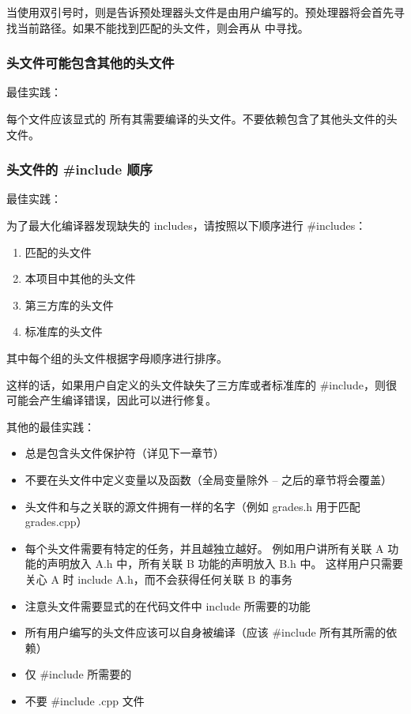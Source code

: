 \documentclass[../../LearnCpp.tex]{subfiles}
\begin{document}
当使用双引号时，则是告诉预处理器头文件是由用户编写的。预处理器将会首先寻找当前路径。如果不能找到匹配的头文件，则会再从  中寻找。

\subsubsection*{头文件可能包含其他的头文件}

最佳实践：

每个文件应该显式的  所有其需要编译的头文件。不要依赖包含了其他头文件的头文件。

\subsubsection*{头文件的 \#include 顺序}

最佳实践：

为了最大化编译器发现缺失的 includes，请按照以下顺序进行 \#includes：

\begin{enumerate}
   \item 匹配的头文件
   \item 本项目中其他的头文件
   \item 第三方库的头文件
   \item 标准库的头文件
\end{enumerate}

其中每个组的头文件根据字母顺序进行排序。

这样的话，如果用户自定义的头文件缺失了三方库或者标准库的 \#include，则很可能会产生编译错误，因此可以进行修复。

其他的最佳实践：

\begin{itemize}
   \item 总是包含头文件保护符（详见下一章节）
   \item 不要在头文件中定义变量以及函数（全局变量除外 -- 之后的章节将会覆盖）
   \item 头文件和与之关联的源文件拥有一样的名字（例如 grades.h 用于匹配 grades.cpp）
   \item 每个头文件需要有特定的任务，并且越独立越好。
         例如用户讲所有关联 A 功能的声明放入 A.h 中，所有关联 B 功能的声明放入 B.h 中。
         这样用户只需要关心 A 时 include A.h，而不会获得任何关联 B 的事务
   \item 注意头文件需要显式的在代码文件中 include 所需要的功能
   \item 所有用户编写的头文件应该可以自身被编译（应该 \#include 所有其所需的依赖）
   \item 仅 \#include 所需要的
   \item 不要 \#include .cpp 文件
\end{itemize}
\end{document}
